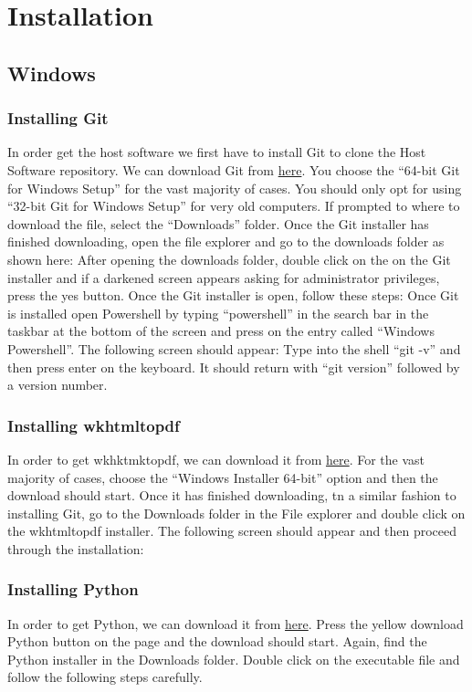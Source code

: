 \documentclass[12pt]{article}
\begin{document}

\tableofcontents
\newpage
\section{Installation}
\subsection{Windows}
\subsubsection{Installing Git}
In order get the host software we first have to install Git to clone the Host Software repository. We can download Git from \href{https://git-scm.com/download/win}{here}. You choose the ``64-bit Git for Windows Setup'' for the vast majority of cases. You should only opt for using ``32-bit Git for Windows Setup'' for very old computers. If prompted to where to download the file, select the ``Downloads'' folder. Once the Git installer has finished downloading, open the file explorer and go to the downloads folder as shown here:
After opening the downloads folder, double click on the on the Git installer and if a darkened screen appears asking for administrator privileges, press the yes button. Once the Git installer is open, follow these steps:
Once Git is installed open Powershell by typing ``powershell'' in the search bar in the taskbar at the bottom of the screen and press on the entry called ``Windows Powershell''. The following screen should appear:
Type into the shell ``git -v'' and  then press enter on the keyboard. It should return with ``git version'' followed by a version number.
\subsubsection{Installing wkhtmltopdf}
In order to get wkhktmktopdf, we can download it from \href{https://wkhtmltopdf.org/downloads.html}{here}. For the vast majority of cases, choose the ``Windows Installer 64-bit'' option and then the download should start. Once it has finished downloading, tn a similar fashion to installing Git, go to the Downloads folder in the File explorer and double click on the wkhtmltopdf installer. The following screen should appear and then proceed through the installation:
\subsubsection{Installing Python}
In order to get Python, we can download it from \href{https://www.python.org/downloads/}{here}. Press the yellow download Python button on the page and the download should start. Again, find the Python installer in the Downloads folder. Double click on the executable file and follow the following steps carefully.
\end{document}
